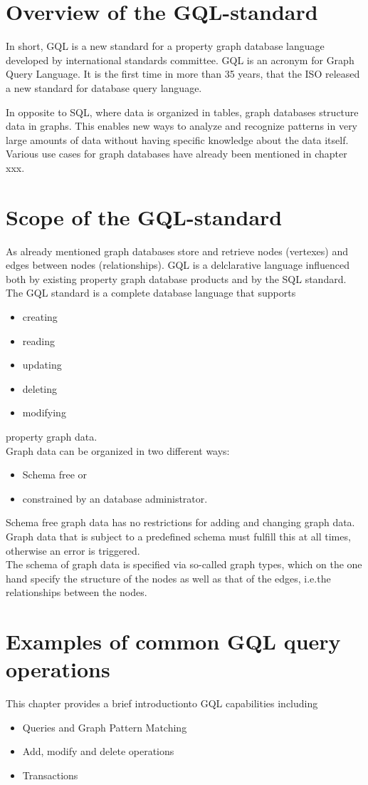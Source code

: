 \section{Overview of the GQL-standard}
In short, GQL is a new standard for a property graph database language developed by 
international standards committee.
GQL is an acronym for Graph Query Language.
It is the first time in more than 35 years, that the ISO released a new 
standard for database query language.

In opposite to SQL, where data is organized in tables, graph databases structure data in graphs. 
This enables new ways to analyze and recognize patterns in very large amounts of 
data without having specific knowledge about the data itself.
Various use cases for graph databases have already been mentioned in chapter xxx.
\section{Scope of the GQL-standard}
As already mentioned graph databases store and retrieve nodes (vertexes) and
edges between nodes (relationships). GQL is a delclarative language influenced both by 
existing property graph database products and by the SQL standard.
The GQL standard is a complete database language that supports
\begin{itemize}
	\item creating
	\item reading
	\item updating
	\item deleting
	\item modifying
\end{itemize}
property graph data. \\
Graph data can be organized in two different ways:
\begin{itemize}
    \item Schema free or
    \item constrained by an database administrator.
\end{itemize}
Schema free graph data has no restrictions for adding and changing graph data.
Graph data that is subject to a predefined schema must fulfill this at all times, 
otherwise an error is triggered.\\
The schema of graph data is specified via so-called graph types, 
which on the one hand specify the structure of the nodes as well as that of the edges, 
i.e.the relationships between the nodes.
\section{Examples of common GQL query operations}
This chapter provides a brief introductionto GQL capabilities including
\begin{itemize}
	\item Queries and Graph Pattern Matching
	\item Add, modify and delete operations
	\item Transactions
\end{itemize}
